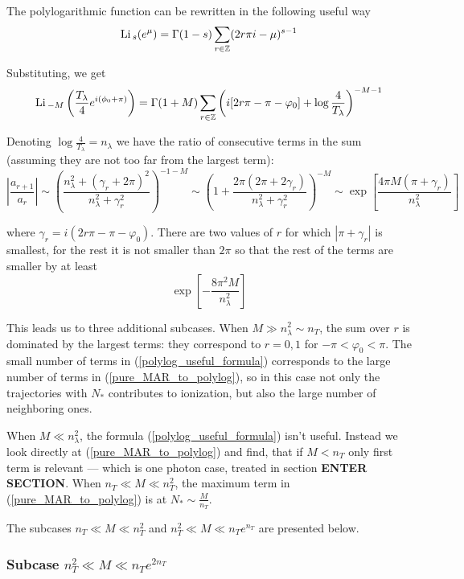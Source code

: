 The polylogarithmic function can be rewritten in the following useful way
\begin{gather}
\label{polylog_useful_formula}
	\mathrm{Li}\,_{s}(e^{\mu})=\Gamma(1-s)\sum_{r\in\mathbb{Z}}(2r\pi i-\mu)^{s-1}
\end{gather}

Substituting, we get
\[
\mathrm{Li}\,_{-M}\left(\frac{T_{\lambda}}{4}e^{i(\phi_{0}+\pi)}\right)=\Gamma(1+M)\sum_{r\in\mathbb{Z}}\left(i[2r\pi-\pi-\varphi_{0}]+\log\frac{4}{T_{\lambda}}\right)^{-M-1}
\]

Denoting $\log\frac{4}{T_{\lambda}}=n_{\lambda}$ we have the ratio
of consecutive terms in the sum (assuming they are not too far from
the largest term):
\[
\left|\frac{a_{r+1}}{a_{r}}\right|\sim\left(\frac{n_{\lambda}^{2}+(\gamma_{r}+2\pi)^{2}}{n_{\lambda}^{2}+\gamma_{r}^{2}}\right)^{-1-M}\sim\left(1+\frac{2\pi(2\pi+2\gamma_{r})}{n_{\lambda}^{2}+\gamma_{r}^{2}}\right)^{-M}\sim\exp\left[\frac{4\pi M(\pi+\gamma_{r})}{n_{\lambda}^{2}}\right]
\]

where $\gamma_{r}=i(2r\pi-\pi-\varphi_{0})$. There are two values of
$r$ for which $|\pi+\gamma_{r}|$ is smallest, for the rest it is
not smaller than $2\pi$ so that the rest of the terms are smaller
by at least 
\[
\exp\left[-\frac{8\pi^{2}M}{n_{\lambda}^{2}}\right]
\]

This leads us to three additional subcases. When $ M \gg n_\lambda^2\sim n_T$, the sum over $ r $ is dominated by the  largest terms: they correspond to $ r=0,1 $ for $ -\pi<\varphi_0<\pi $. The small number of terms in (\ref{polylog_useful_formula}) corresponds to the large number of terms in (\ref{pure_MAR_to_polylog}), so in this case not only the trajectories with $ N_* $ contributes to ionization, but also the large number of neighboring ones.

When $ M\ll n_\lambda^2 $, the formula (\ref{polylog_useful_formula}) isn't useful. Instead we look directly at (\ref{pure_MAR_to_polylog}) and find, that if $ M<n_T $ only first term is relevant --- which is one photon case, treated in section \textbf{ENTER SECTION}. When $ n_T\ll M\ll n_T^2 $, the maximum term in (\ref{pure_MAR_to_polylog}) is at $ N_*\sim\frac{M}{n_T} $.

The subcases $ n_T \ll M\ll n_T^2 $ and $ n_T^2 \ll M\ll n_T e^{n_T} $ are presented below.

\subsubsection{ Subcase $ n_T^2 \ll M\ll n_T e^{2n_T} $}

